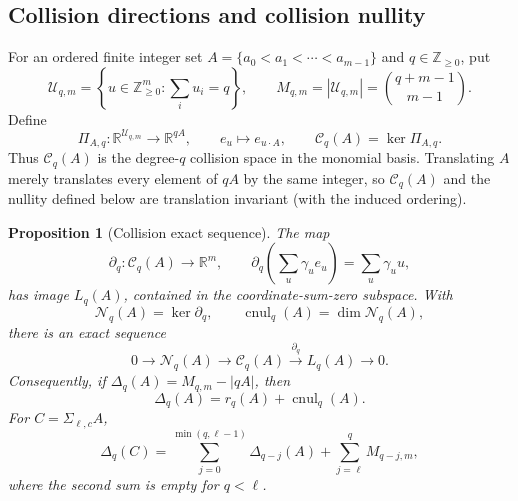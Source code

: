 \documentclass[11pt,reqno]{amsart}
\newtheorem{proposition}[theorem]{Proposition}
\theoremstyle{definition}
\theoremstyle{remark}
\begin{document}
\subsection{Collision directions and collision nullity}

For an ordered finite integer set
$A=\{a_0<a_1<\cdots<a_{m-1}\}$ and
$q\in\mathbb Z_{\geq0}$, put
\[
 \mathcal U_{q,m}
 =\left\{u\in\mathbb Z_{\geq0}^m:\sum_i u_i=q\right\},
 \qquad
 M_{q,m}=|\mathcal U_{q,m}|=\binom{q+m-1}{m-1}.
\]
Define
\[
 \Pi_{A,q}:\mathbb R^{\mathcal U_{q,m}}\longrightarrow\mathbb R^{qA},
 \qquad e_u\longmapsto e_{u\cdot A},
 \qquad
 \mathcal C_q(A)=\ker\Pi_{A,q}.
\]
Thus $\mathcal C_q(A)$ is the degree-$q$ collision space in the monomial
basis.  Translating $A$ merely translates every element of $qA$ by the same
integer, so $\mathcal C_q(A)$ and the nullity defined below are translation
invariant (with the induced ordering).

\begin{proposition}[Collision exact sequence]
\label{prop:collision-exact-sequence}
The map
\[
 \partial_q:\mathcal C_q(A)\longrightarrow\mathbb R^m,
 \qquad
 \partial_q\!\left(\sum_u\gamma_ue_u\right)=\sum_u\gamma_u u,
\]
has image $L_q(A)$, contained in the coordinate-sum-zero subspace.  With
\[
 \mathcal N_q(A)=\ker\partial_q,
 \qquad \operatorname{cnul}_q(A)=\dim\mathcal N_q(A),
\]
there is an exact sequence
\begin{equation}\label{eq:collision-exact-sequence}
 0\longrightarrow\mathcal N_q(A)
 \longrightarrow\mathcal C_q(A)
 \xrightarrow{\partial_q}L_q(A)
 \longrightarrow0.
\end{equation}
Consequently, if $\Delta_q(A)=M_{q,m}-|qA|$, then
\begin{equation}\label{eq:defect-rank-nullity}
 \boxed{\Delta_q(A)=r_q(A)+\operatorname{cnul}_q(A).}
\end{equation}
For $C=\Sigma_{\ell,c}A$,
\begin{equation}\label{eq:suspension-defect-transform}
 \Delta_q(C)
 =\sum_{j=0}^{\min(q,\ell-1)}\Delta_{q-j}(A)
  +\sum_{j=\ell}^{q}M_{q-j,m},
\end{equation}
where the second sum is empty for $q<\ell$.
\end{proposition}
\end{document}
